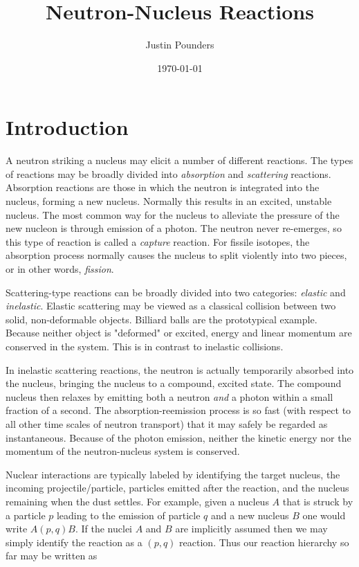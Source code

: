 \documentclass[11pt]{article}
\author{Justin Pounders}
\date{\today}
\title{Neutron-Nucleus Reactions}
\begin{document}
\maketitle
\tableofcontents

\section{Introduction}
\label{sec:orgheadline1}
A neutron striking a nucleus may elicit a number of different reactions.  The types of reactions may be broadly divided into \emph{absorption} and \emph{scattering} reactions.  Absorption reactions are those in which the neutron is integrated into the nucleus, forming a new nucleus.  Normally this results in an excited, unstable nucleus.  The most common way for the nucleus to alleviate the pressure of the new nucleon is through emission of a photon.  The neutron never re-emerges, so this type of reaction is called a \emph{capture} reaction.  For fissile isotopes, the absorption process normally causes the nucleus to split violently into two pieces, or in other words, \emph{fission}.

Scattering-type reactions can be broadly divided into two categories: \emph{elastic} and \emph{inelastic}.  Elastic scattering may be viewed as a classical collision between two solid, non-deformable objects.  Billiard balls are the prototypical example.  Because neither object is "deformed" or excited, energy and linear momentum are conserved in the system.  This is in contrast to inelastic collisions.  

In inelastic scattering reactions, the neutron is actually temporarily absorbed into the nucleus, bringing the nucleus to a compound, excited state.  The compound nucleus then relaxes by emitting both a neutron \emph{and} a photon within a small fraction of a second.  The absorption-reemission process is so fast (with respect to all other time scales of neutron transport) that it may safely be regarded as instantaneous.  Because of the photon emission, neither the kinetic energy nor the momentum of the neutron-nucleus system is conserved.

Nuclear interactions are typically labeled by identifying the target nucleus, the incoming projectile/particle, particles emitted after the reaction, and the nucleus remaining when the dust settles.  For example, given a nucleus \(A\) that is struck by a particle \(p\) leading to the emission of particle \(q\) and a new nucleus \(B\) one would write \(A(p,q)B\).  If the nuclei \(A\) and \(B\) are implicitly assumed then we may simply identify the reaction as a \((p,q)\) reaction.  Thus our reaction hierarchy so far may be written as
\end{document}
